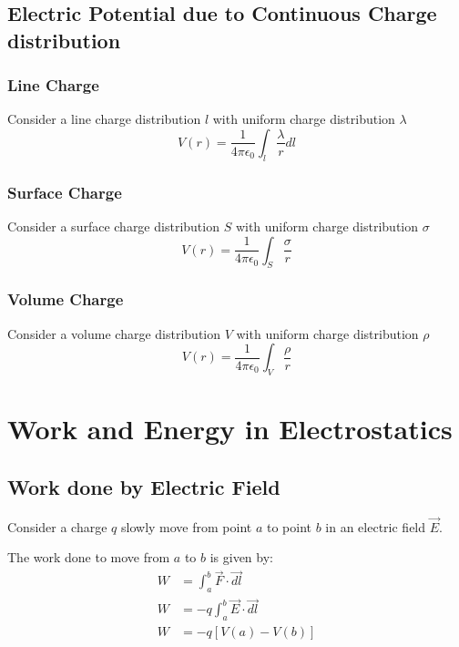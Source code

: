 \documentclass{article}
\begin{document}
\subsection{Electric Potential due to Continuous Charge distribution}
\subsubsection{Line Charge}
Consider a line charge distribution $l$ with uniform charge distribution $\lambda$ \\
\[ V(r) = \frac{1}{4\pi\epsilon_0} \int_{l} \frac{\lambda}{r} dl \]

\subsubsection{Surface Charge}
Consider a surface charge distribution $S$ with uniform charge distribution $\sigma$ \\
\[ V(r) = \frac{1}{4 \pi \epsilon_0} \int_{S} \frac{\sigma}{r} \]

\subsubsection{Volume Charge}
Consider a volume charge distribution $V$ with uniform charge distribution $\rho$ \\
\[  V(r) = \frac{1}{4 \pi \epsilon_0} \int_{V} \frac{\rho}{r} \]

\section{Work and Energy in Electrostatics}
\subsection{Work done by Electric Field}
Consider a charge $q$ slowly move from point $a$ to point $b$ in an electric field $\vec{E}$.\\


The work done to move from $a$ to $b$ is given by:
\begin{align*}
	W & = \int_{a}^{b} \vec{F} \cdot \vec{dl}    \\
	W & = -q \int_{a}^{b} \vec{E} \cdot \vec{dl} \\
	W & = -q \left[V(a) - V(b)\right]
\end{align*}
\end{document}
